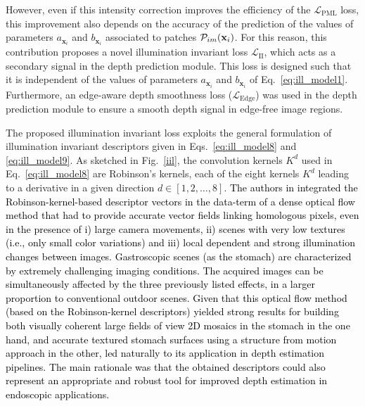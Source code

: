 \documentclass[a4paper,fleqn]{cas-dc}
\begin{document}
{However, even if this intensity correction improves the efficiency of the $\mathcal{L}_{\textrm{PML}}$ loss, this improvement also depends on the accuracy of the prediction of the values of parameters $a_{\mathbf{x}_i}$ and $b_{\mathbf{x}_i}$ associated to patches $\mathcal{P}_{im}({\bf x}_i)$. For this reason, this contribution proposes a novel illumination invariant loss $\mathcal{L}_{\textrm{II}}$, which acts as a secondary signal in the depth prediction module. This loss is designed such that it is independent of the values of parameters $a_{\mathbf{x}_i}$ and $b_{\mathbf{x}_i}$ of Eq.~\eqref{eq:ill_model1}.
Furthermore, an edge-aware depth smoothness loss ($\mathcal{L}_{\textrm{Edge}}$)  was used in the depth prediction module to ensure a smooth depth signal in edge-free image regions.
%

\vspace*{1 mm}
 The proposed illumination invariant loss exploits the general formulation of illumination invariant descriptors given in Eqs.~\eqref{eq:ill_model8} and \eqref{eq:ill_model9}. As sketched in Fig.~\ref{iil}, the convolution kernels $K^d$ used in Eq.~\eqref{eq:ill_model8} are Robinson's kernels, each of the eight kernels $K^d$ leading to a derivative in a given direction $d \in [1, 2, \ldots, 8]$. \textcolor{black}{The authors in  \citep{Trinh_CVIU_2019} integrated the Robinson-kernel-based descriptor vectors in the data-term of a dense optical flow method that had to provide accurate vector fields linking homologous pixels, even in the presence of i) large camera movements, ii) scenes with very low textures (i.e., only small color variations) and iii) local dependent and strong  illumination changes between images. Gastroscopic scenes (as the stomach) are characterized by extremely challenging imaging conditions. The acquired images can be simultaneously affected by the three previously listed effects, in a larger proportion to conventional outdoor scenes. Given  that this optical flow method (based on the Robinson-kernel descriptors) yielded strong results for building  both visually coherent large fields of view 2D mosaics in the stomach \citep{Zenteno_CBM_2022} in the one hand, and accurate textured stomach surfaces using a structure from motion approach \citep{Phan_PR_2020} in the other, led naturally to its application in depth estimation pipelines. The main rationale was that the obtained descriptors could also represent an appropriate and robust tool for improved depth estimation in endoscopic applications.}

}
\end{document}
